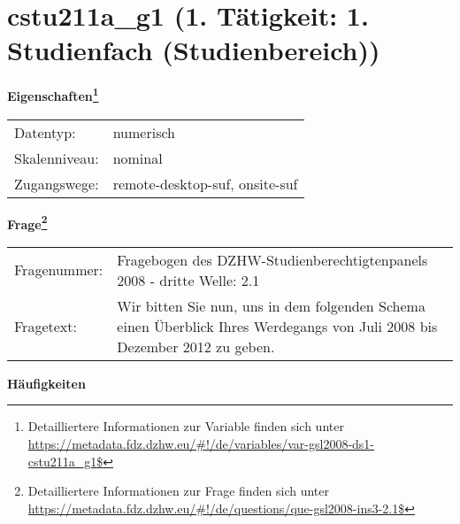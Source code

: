 
    \setcounter{footnote}{0}

    \vspace*{-1.8cm}
	\section{cstu211a\_g1 (1. Tätigkeit: 1. Studienfach (Studienbereich))}
	\label{section:cstu211a_g1}



    \vspace*{0.5cm}
    \noindent\textbf{Eigenschaften\footnote{Detailliertere Informationen zur Variable finden sich unter
		\url{https://metadata.fdz.dzhw.eu/\#!/de/variables/var-gsl2008-ds1-cstu211a_g1$}}}\\
	\begin{tabularx}{\hsize}{@{}lX}
	Datentyp: & numerisch \\
	Skalenniveau: & nominal \\
	Zugangswege: &
	  remote-desktop-suf, 
	  onsite-suf
 \\
    \end{tabularx}



				\vspace*{0.5cm}
                \noindent\textbf{Frage\footnote{Detailliertere Informationen zur Frage finden sich unter
		              \url{https://metadata.fdz.dzhw.eu/\#!/de/questions/que-gsl2008-ins3-2.1$}}}\\
				\begin{tabularx}{\hsize}{@{}lX}
					Fragenummer: &
					  Fragebogen des DZHW-Studienberechtigtenpanels 2008 - dritte Welle:
					  2.1
 \\
					Fragetext: & Wir bitten Sie nun, uns in dem folgenden Schema einen Überblick Ihres Werdegangs von Juli 2008 bis Dezember 2012 zu geben. \\
				\end{tabularx}





        		\vspace*{0.5cm}
                \noindent\textbf{Häufigkeiten}

